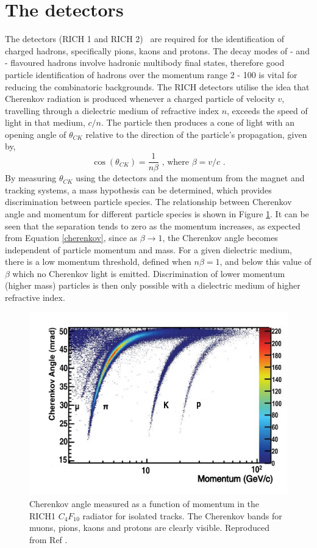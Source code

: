 \section{The \rich detectors}
\label{sec:detector:rich}

The \rich detectors (RICH 1 and RICH 2)~\cite{LHCb-DP-2012-003} are required for the identification of charged hadrons, specifically pions, kaons and protons. The decay modes of \bquark- and \cquark- flavoured hadrons involve hadronic multibody final states, therefore good particle identification of hadrons over the momentum range 2 - 100 \gevc is vital for reducing the combinatoric backgrounds. The RICH detectors utilise the idea that Cherenkov radiation is produced whenever a charged particle of velocity $v$, travelling through a dielectric medium of refractive index $n$, exceeds the speed of light in that medium, $c/n$. The particle then produces a cone of light with an opening angle of $\theta_{CK}$ relative to the direction of the particle's propagation, given by,
\begin{equation}
\cos\left(\theta_{CK}\right) = \frac{1}{n\beta} \text{ ,     where }  \beta = v/c \text{ .}
\label{cherenkov}
\end{equation}
By measuring $\theta_{CK}$ using the \rich detectors and the momentum from the magnet and tracking systems, a mass hypothesis can be determined, which provides discrimination between particle species. The relationship between Cherenkov angle and momentum for different particle species is shown in Figure \ref{richseparation}. It can be seen that the separation tends to zero as the momentum increases, as expected from Equation \ref{cherenkov}, since as $\beta \rightarrow 1$, the Cherenkov angle becomes independent of particle momentum and mass. For a given dielectric medium, there is a low momentum threshold, defined when $n\beta = 1$, and below this value of $\beta$ which no Cherenkov light is emitted. Discrimination of lower momentum (higher mass) particles is then only possible with a dielectric medium of higher refractive index.

\begin{figure}
\centering
\includegraphics[width=0.8\linewidth]{figures/detector/richseparation.pdf}
\caption{Cherenkov angle measured as a function of momentum in the RICH1 $C_{4}F_{10}$ radiator for isolated tracks. The Cherenkov bands for muons, pions, kaons and protons are clearly visible. Reproduced from Ref \cite{LHCb-DP-2012-003}.}
\label{richseparation}
\end{figure}

